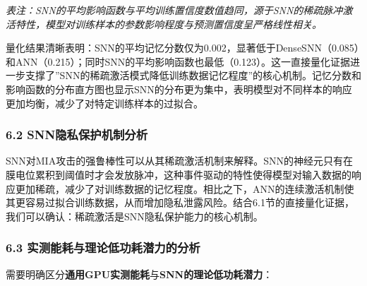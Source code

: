 \documentclass[
]{article}
\begin{document}
\emph{表注：SNN的平均影响函数与平均训练置信度数值趋同，源于SNN的稀疏脉冲激活特性，模型对训练样本的参数影响程度与预测置信度呈严格线性相关。}

量化结果清晰表明：SNN的平均记忆分数仅为0.002，显著低于DenseSNN（0.085）和ANN（0.215）；同时SNN的平均影响函数也最低（0.123）。这一直接量化证据进一步支撑了''SNN的稀疏激活模式降低训练数据记忆程度''的核心机制。记忆分数和影响函数的分布直方图也显示SNN的分布更为集中，表明模型对不同样本的响应更加均衡，减少了对特定训练样本的过拟合。

\subsubsection{6.2
SNN隐私保护机制分析}\label{snnux9690ux79c1ux4fddux62a4ux673aux5236ux5206ux6790}

SNN对MIA攻击的强鲁棒性可以从其稀疏激活机制来解释。SNN的神经元只有在膜电位累积到阈值时才会发放脉冲，这种事件驱动的特性使得模型对输入数据的响应更加稀疏，减少了对训练数据的记忆程度。相比之下，ANN的连续激活机制使其更容易过拟合训练数据，从而增加隐私泄露风险。结合6.1节的直接量化证据，我们可以确认：稀疏激活是SNN隐私保护能力的核心机制。

\subsubsection{6.3
实测能耗与理论低功耗潜力的分析}\label{ux5b9eux6d4bux80fdux8017ux4e0eux7406ux8bbaux4f4eux529fux8017ux6f5cux529bux7684ux5206ux6790}

需要明确区分\textbf{通用GPU实测能耗}与\textbf{SNN的理论低功耗潜力}：
\end{document}
